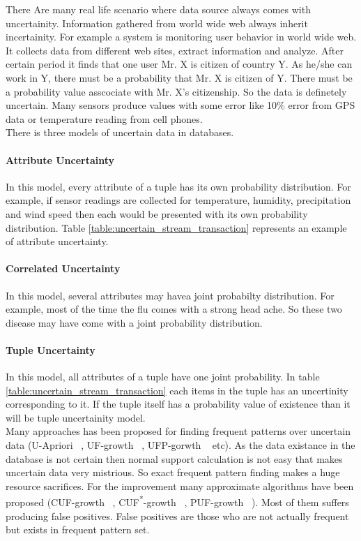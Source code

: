 There Are many real life scenario where data source always comes with uncertainity. Information gathered from world wide web always inherit incertainity. For example a system is monitoring user behavior in world wide web. It collects data from different web sites, extract information and analyze. After certain period it finds that one user Mr. X is citizen of country Y. As he/she can work in Y, there must be a probability that Mr. X is citizen of Y. There must be a probability value asscociate with Mr. X's citizenship. So the data is definetely uncertain. Many sensors produce values with some error like 10\% error from GPS data or temperature reading from cell phones.\\
There is three models of uncertain data in databases.
\paragraph{Attribute Uncertainty}
In this model, every attribute of a tuple has its own probability distribution. For example, if sensor readings are collected for temperature, humidity, precipitation and wind speed then each would be presented with its own probability distribution. Table \ref{table:uncertain_stream_transaction} represents an example of attribute uncertainty.
\paragraph{Correlated Uncertainty}
In this model, several attributes may havea joint probabilty distribution. For example, most of the time the flu comes with a strong head ache. So these two disease may have come with a joint probability distribution.
\paragraph{Tuple Uncertainty}
In this model, all attributes of a tuple have one joint probability. In table \ref{table:uncertain_stream_transaction}  each items in the tuple has an uncertinity corresponding to it. If the tuple itself has a probability value of existence than it will be tuple uncertainity model.\\
Many approaches has been proposed for finding frequent patterns over uncertain data (U-Apriori ~\cite{u_priori}, UF-growth ~\cite{uf_growth}, UFP-gorwth ~\cite{ufp_growth} etc). As the data existance in the database is not certain then normal support calculation is not easy that makes uncertain data very mistrious. So exact frequent pattern finding makes a huge resource sacrifices. For the improvement many approximate algorithms have been proposed (CUF-growth ~\cite{cuf_growth}, CUF\textsuperscript{*}-growth ~\cite{cuf_growth}, PUF-growth ~\cite{puf_growth}). Most of them suffers producing false positives. False positives are those who are not actually frequent but exists in frequent pattern set.

